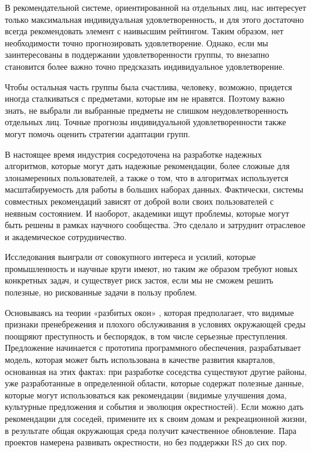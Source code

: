 В рекомендательной системе, ориентированной на отдельных лиц, нас интересует только максимальная индивидуальная удовлетворенность, и для этого достаточно всегда рекомендовать элемент с наивысшим рейтингом. Таким образом, нет необходимости точно прогнозировать удовлетворение. Однако, если мы заинтересованы в поддержании удовлетворенности группы, то внезапно становится более важно точно предсказать индивидуальное удовлетворение.

Чтобы остальная часть группы была счастлива, человеку, возможно, придется иногда сталкиваться с предметами, которые им не нравятся. Поэтому важно знать, не выбрали ли выбранные предметы не слишком неудовлетворенность отдельных лиц. Точные прогнозы индивидуальной удовлетворенности также могут помочь оценить стратегии адаптации групп.


В настоящее время индустрия сосредоточена на разработке надежных алгоритмов, которые могут дать надежные рекомендации, более сложные для злонамеренных пользователей, а также о том, что в алгоритмах используется масштабируемость для работы в больших наборах данных. Фактически, системы совместных рекомендаций зависят от доброй воли своих пользователей с неявным состоянием. И наоборот, академики ищут проблемы, которые могут быть решены в рамках научного сообщества. Это сделало и затруднит отраслевое и академическое сотрудничество.

Исследования выиграли от совокупного интереса и усилий, которые промышленность и научные круги имеют, но таким же образом требуют новых конкретных задач, и существует риск застоя, если мы не сможем решить полезные, но рискованные задачи в пользу проблем.

Основываясь на теории «разбитых окон» \cite{brokenw}, которая предполагает, что видимые признаки пренебрежения и плохого обслуживания в условиях окружающей среды поощряют преступность и беспорядок, в том числе серьезные преступления. Предложение начинается с прототипа программного обеспечения, разрабатывает модель, которая может быть использована в качестве развития кварталов, основанная на этих фактах: при разработке соседства существуют другие районы, уже разработанные в определенной области, которые содержат полезные данные, которые могут использоваться как рекомендации (видимые улучшения дома, культурные предложения и события и эволюция окрестностей). Если можно дать рекомендации для соседей, примените их к своим домам и рекреационной жизни, в результате общая окружающая среда получит качественное обновление. Пара проектов \cite{oregon}\cite{nextdoor} намерена развивать окрестности, но без поддержки RS до сих пор.


